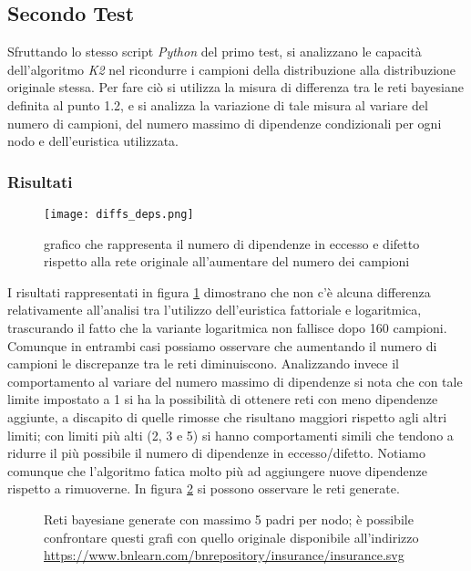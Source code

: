 \subsection{Secondo Test}

Sfruttando lo stesso script \textit{Python} del primo test, si analizzano le capacità
dell'algoritmo \textit{K2} nel ricondurre i campioni della distribuzione alla distribuzione
originale stessa. Per fare ciò si utilizza la misura di differenza tra le reti bayesiane definita
al punto 1.2, e si analizza la variazione di tale misura al variare del numero di campioni, del
numero massimo di dipendenze condizionali per ogni nodo e dell'euristica utilizzata.

\subsubsection{Risultati}

\begin{figure}[h]
    \centering
    \texttt{[image: diffs\_deps.png]}
    \caption{grafico che rappresenta il numero di dipendenze in eccesso e difetto rispetto alla rete
        originale all'aumentare del numero dei campioni}
    \label{fig:test2}
\end{figure}

I risultati rappresentati in figura \ref{fig:test2} dimostrano che non c'è alcuna differenza
relativamente all'analisi tra l'utilizzo dell'euristica fattoriale e logaritmica, trascurando il
fatto che la variante logaritmica non fallisce dopo 160 campioni. Comunque in entrambi casi
possiamo osservare che aumentando il numero di campioni le discrepanze tra le reti diminuiscono.
Analizzando invece il comportamento al variare del numero massimo di dipendenze si nota che con
tale limite impostato a 1 si ha la possibilità di ottenere reti con meno dipendenze aggiunte, a
discapito di quelle rimosse che risultano maggiori rispetto agli altri limiti; con limiti più alti
(2, 3 e 5) si hanno comportamenti simili che tendono a ridurre il più possibile il numero di
dipendenze in eccesso/difetto. Notiamo comunque che l'algoritmo fatica molto più ad aggiungere
nuove dipendenze rispetto a rimuoverne. In figura \ref{fig:test2:2} si possono osservare le reti
generate.

\begin{figure}
    \centering
    \qquad
    \caption{Reti bayesiane generate con massimo 5 padri per nodo; è possibile confrontare questi
        grafi con quello originale disponibile all'indirizzo \url{https://www.bnlearn.com/bnrepository/insurance/insurance.svg}}
    \label{fig:test2:2}%
\end{figure}

